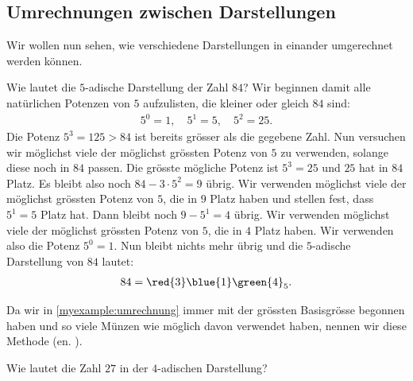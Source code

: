\subsection{Umrechnungen zwischen Darstellungen}
Wir wollen nun sehen, wie verschiedene Darstellungen in einander umgerechnet werden können.
\begin{myexample}\label{myexample:umrechnung}
  Wie lautet die $5$-adische Darstellung der Zahl $84$? Wir beginnen damit alle natürlichen Potenzen von $5$
  aufzulisten, die kleiner oder gleich $84$ sind:
  \begin{align*}
    5^0 = 1, \quad 5^1 = 5, \quad 5^2 = 25.
  \end{align*}
  Die Potenz $5^3 = 125 > 84$ ist bereits grösser als die gegebene Zahl. Nun versuchen wir möglichst viele der möglichst
  grössten Potenz von $5$ zu verwenden, solange diese noch in $84$ passen. Die grösste mögliche Potenz ist $5^3 = 25$ und
  $25$ hat  in $84$ Platz. Es bleibt also noch $84-3\cdot 5^2 = 9$ übrig. Wir verwenden möglichst viele der
  möglichst grössten Potenz von $5$, die in $9$ Platz haben und stellen fest, dass $5^1=5$  Platz hat. Dann
  bleibt noch $9-5^1 = 4$ übrig. Wir verwenden möglichst viele der möglichst grössten Potenz von $5$, die in $4$ Platz
  haben. Wir verwenden also  die Potenz $5^0 = 1$. Nun bleibt nichts mehr übrig und die $5$-adische
  Darstellung von $84$ lautet:
  \begin{align*}
    84 = \red{3}\blue{1}\green{4}_5.
  \end{align*}
\end{myexample}
Da wir in \cref{myexample:umrechnung} immer mit der grössten Basisgrösse begonnen haben und so viele Münzen wie möglich davon verwendet haben, nennen wir diese Methode  (en. ).

\begin{myexercise}
  Wie lautet die Zahl $27$ in der $4$-adischen Darstellung?
\end{myexercise}
